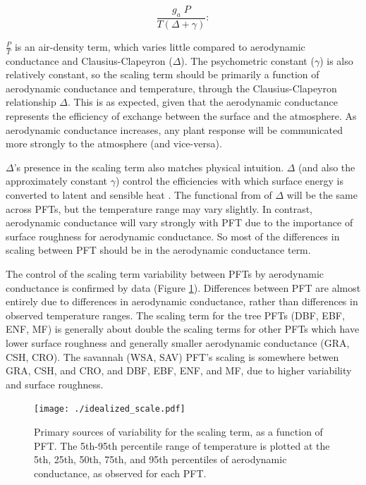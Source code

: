 \documentclass[draft,linenumbers]{agujournal}
\begin{document}
\begin{equation}
  \frac{g_a \; P}{T(\Delta + \gamma)}:
\end{equation}

$\frac{P}{T}$ is an air-density term, which varies little compared to
aerodynamic conductance and Clausius-Clapeyron ($\Delta$). The
psychometric constant ($\gamma$) is also relatively constant, so the
scaling term should be primarily a function of aerodynamic conductance
and temperature, through the Clausius-Clapeyron relationship
$\Delta$. This is as expected, given that the aerodynamic conductance
represents the efficiency of exchange between the surface and the
atmosphere. As aerodynamic conductance increases, any plant response
will be communicated more strongly to the atmosphere (and vice-versa).

$\Delta$'s presence in the scaling term also matches physical
intuition. $\Delta$ (and also the approximately constant $\gamma$)
control the efficiencies with which surface energy is converted to
latent and sensible heat \citep{Monteith_1965}. The functional from of
$\Delta$ will be the same across PFTs, but the temperature range may
vary slightly. In contrast, aerodynamic conductance will vary strongly
with PFT due to the importance of surface roughness for aerodynamic
conductance. So most of the differences in scaling between PFT should
be in the aerodynamic conductance term.

The control of the scaling term variability between PFTs by
aerodynamic conductance is confirmed by data (Figure
\ref{scale_vary}). Differences between PFT are almost entirely due to
differences in aerodynamic conductance, rather than differences in
observed temperature ranges. The scaling term for the tree PFTs (DBF,
EBF, ENF, MF) is generally about double the scaling terms for other
PFTs which have lower surface roughness and generally smaller
aerodynamic conductance (GRA, CSH, CRO). The savannah (WSA, SAV) PFT's
scaling is somewhere betwen GRA, CSH, and CRO, and DBF, EBF, ENF, and
MF, due to higher variability and surface roughness.

\begin{figure}
  \centerline{\texttt{[image: ./idealized\_scale.pdf]}}
  \caption{Primary sources of variability for the scaling term, as a
    function of PFT. The 5th-95th percentile range of temperature is
    plotted at the 5th, 25th, 50th, 75th, and 95th percentiles of
    aerodynamic conductance, as observed for each PFT.}
  \label{scale_vary}
\end{figure}
\end{document}
